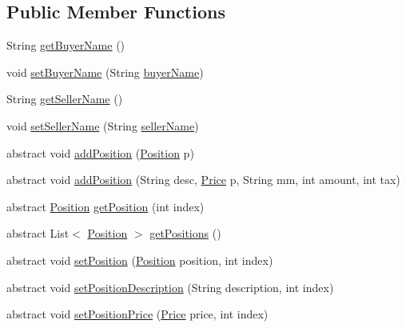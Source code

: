 \subsection*{Public Member Functions}
\begin{DoxyCompactItemize}
\item 
String \hyperlink{class_reduced_invoice_1_1_a_invoice_a0099d82cccbb09bc9240269c76c079d4}{get\+Buyer\+Name} ()
\item 
void \hyperlink{class_reduced_invoice_1_1_a_invoice_ab47710855319e2cf64a829d9bb37d243}{set\+Buyer\+Name} (String \hyperlink{class_reduced_invoice_1_1_a_invoice_ae75bdd20da8fa21dec01c2d032ac11c5}{buyer\+Name})
\item 
String \hyperlink{class_reduced_invoice_1_1_a_invoice_ac8973df8a999bc5556d697ed17c871f7}{get\+Seller\+Name} ()
\item 
void \hyperlink{class_reduced_invoice_1_1_a_invoice_a45129f98801ec280c52c2de35b48da0b}{set\+Seller\+Name} (String \hyperlink{class_reduced_invoice_1_1_a_invoice_ae00a97e1c74841fe0b0b43fccd1da24d}{seller\+Name})
\item 
abstract void \hyperlink{class_reduced_invoice_1_1_a_invoice_a29b30209d39ee91edee303ba5d36fd81}{add\+Position} (\hyperlink{class_reduced_invoice_1_1_position}{Position} p)
\item 
abstract void \hyperlink{class_reduced_invoice_1_1_a_invoice_ae126e009135936362d30c61ea7b20b52}{add\+Position} (String desc, \hyperlink{class_reduced_invoice_1_1_price}{Price} p, String mm, int amount, int tax)
\item 
abstract \hyperlink{class_reduced_invoice_1_1_position}{Position} \hyperlink{class_reduced_invoice_1_1_a_invoice_a1264648436c734afc549b2d1adb20ff6}{get\+Position} (int index)
\item 
abstract List$<$ \hyperlink{class_reduced_invoice_1_1_position}{Position} $>$ \hyperlink{class_reduced_invoice_1_1_a_invoice_a62a407f4bec81c5dbd392f68ecff6582}{get\+Positions} ()
\item 
abstract void \hyperlink{class_reduced_invoice_1_1_a_invoice_a3abfa40d89bdc9f56daaf73adafcca5e}{set\+Position} (\hyperlink{class_reduced_invoice_1_1_position}{Position} position, int index)
\item 
abstract void \hyperlink{class_reduced_invoice_1_1_a_invoice_a01a6d1c001117851fdcb6941a117c086}{set\+Position\+Description} (String description, int index)
\item 
abstract void \hyperlink{class_reduced_invoice_1_1_a_invoice_a0fb3b8175eac0e76c906a986ba7d6161}{set\+Position\+Price} (\hyperlink{class_reduced_invoice_1_1_price}{Price} price, int index)

\end{DoxyCompactItemize}
